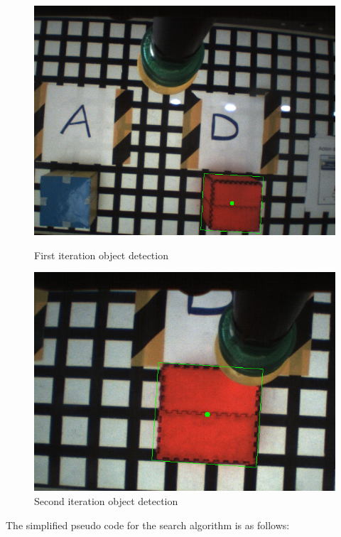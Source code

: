 \begin{figure}[h]
\centering
\begin{minipage}{0.5\textwidth}
  \centering
    \includegraphics[scale=0.35]{figures/detectObject1}
    \caption{First iteration object detection}
    \label{fig:detectObject1}
\end{minipage}%
\begin{minipage}{.5\textwidth}
  \centering
    \includegraphics[scale=0.45]{figures/detectObject2}
    \caption{Second iteration object detection}
    \label{fig:detectObject2}
\end{minipage}
\end{figure}

The simplified pseudo code for the search algorithm is as follows:

